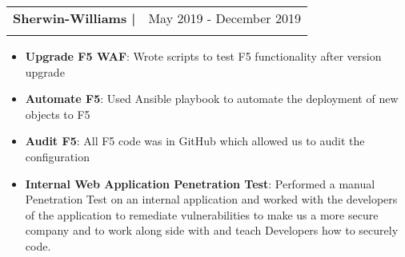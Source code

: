\documentclass[letterpaper,11pt]{article}
\makeatletter
\newcommand{\resumeItem}[2]{
  \item\small{
    \textbf{#1}{: #2 \vspace{-2pt}}
  }
}
\newcommand{\resumeSubheading}[4]{
  \vspace{-1pt}\item[]
  \begin{tabular*}{0.98\textwidth}{l@{\extracolsep{\fill}}r}
      \hspace{-10pt}\textbf{#1} & {#2} \\
      \hspace{-10pt}{#3} & {#4} \\
    \end{tabular*}\vspace{-5pt}
}
\newcommand{\resumeItemListStart}{\begin{itemize}}
\newcommand{\resumeItemListEnd}{\end{itemize}\vspace{-5pt}}
\makeatother
\begin{document}
    \resumeSubheading
      {Sherwin-Williams | \normalfont{Application Security Intern}}{May 2019 - December 2019}
      {\vspace{-10pt}}{\vspace{-10pt}}
      \resumeItemListStart
        \resumeItem{Upgrade F5 WAF}
          {Wrote scripts to test F5 functionality after version upgrade}
        \resumeItem{Automate F5}{Used Ansible playbook to automate the deployment of new objects to F5}
        \resumeItem{Audit F5}{All F5 code was in GitHub which allowed us to audit the configuration}
        \resumeItem{Internal Web Application Penetration Test}
        {Performed a manual Penetration Test on an internal application and worked with the developers of the application to remediate vulnerabilities to make us a more secure company and to work along side with and teach Developers how to securely code.}
      \resumeItemListEnd
\end{document}
